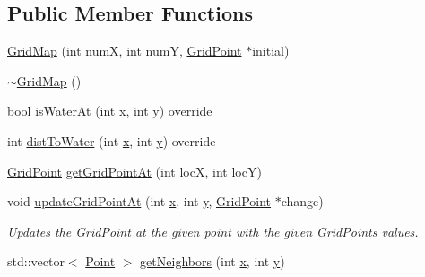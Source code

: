 \subsection*{Public Member Functions}
\begin{DoxyCompactItemize}
\item 
\mbox{\hyperlink{class_world_architect_1_1_grid_map_a2641cc9e0438e74c3f43cf85a92d6d55}{Grid\+Map}} (int numX, int numY, \mbox{\hyperlink{struct_world_architect_1_1_grid_point}{Grid\+Point}} $\ast$initial)
\item 
\mbox{\hyperlink{class_world_architect_1_1_grid_map_a53cc0906130bae883f5d544480039118}{$\sim$\+Grid\+Map}} ()
\item 
bool \mbox{\hyperlink{class_world_architect_1_1_grid_map_ae4562a4b2e6db010954854d64d1c5103}{is\+Water\+At}} (int \mbox{\hyperlink{class_world_architect_1_1_map_a1b4cf9200dca11577b4567584a1e62b8}{x}}, int \mbox{\hyperlink{class_world_architect_1_1_map_abd1e160bb8b03587caac4fb508c13307}{y}}) override
\item 
int \mbox{\hyperlink{class_world_architect_1_1_grid_map_ace26eee126a54bab32beee43a8adb560}{dist\+To\+Water}} (int \mbox{\hyperlink{class_world_architect_1_1_map_a1b4cf9200dca11577b4567584a1e62b8}{x}}, int \mbox{\hyperlink{class_world_architect_1_1_map_abd1e160bb8b03587caac4fb508c13307}{y}}) override
\item 
\mbox{\hyperlink{struct_world_architect_1_1_grid_point}{Grid\+Point}} \mbox{\hyperlink{class_world_architect_1_1_grid_map_a2f2f33edd0ff4eef14cfc14d6fb02337}{get\+Grid\+Point\+At}} (int locX, int locY)
\item 
void \mbox{\hyperlink{class_world_architect_1_1_grid_map_a67735350af692d4e42fe83e21c0cbe04}{update\+Grid\+Point\+At}} (int \mbox{\hyperlink{class_world_architect_1_1_map_a1b4cf9200dca11577b4567584a1e62b8}{x}}, int \mbox{\hyperlink{class_world_architect_1_1_map_abd1e160bb8b03587caac4fb508c13307}{y}}, \mbox{\hyperlink{struct_world_architect_1_1_grid_point}{Grid\+Point}} $\ast$change)
\begin{DoxyCompactList}\small\item\em Updates the \mbox{\hyperlink{struct_world_architect_1_1_grid_point}{Grid\+Point}} at the given point with the given \mbox{\hyperlink{struct_world_architect_1_1_grid_point}{Grid\+Point}}\textquotesingle{}s values. \end{DoxyCompactList}\item 
std\+::vector$<$ \mbox{\hyperlink{namespace_world_architect_afe984ab247ed2917d3a738c7d83d33ca}{Point}} $>$ \mbox{\hyperlink{class_world_architect_1_1_grid_map_a353fd3d5ac4bbfe84450814e0e5336bf}{get\+Neighbors}} (int \mbox{\hyperlink{class_world_architect_1_1_map_a1b4cf9200dca11577b4567584a1e62b8}{x}}, int \mbox{\hyperlink{class_world_architect_1_1_map_abd1e160bb8b03587caac4fb508c13307}{y}})

\end{DoxyCompactItemize}
